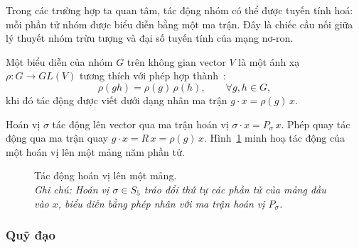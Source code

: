 Trong các trường hợp ta quan tâm, tác động nhóm có thể được tuyến tính hoá: mỗi phần tử nhóm được biểu diễn bằng một ma trận. Đây là chiếc cầu nối giữa lý thuyết nhóm trừu tượng và đại số tuyến tính của mạng nơ-ron.
 
\begin{definition}
\label{def:bieu-dien}
Một biểu diễn của nhóm $G$ trên không gian vector $V$ là một ánh xạ $\rho:G\to GL(V)$ tương thích với phép hợp thành~\cite{bronstein2021geometric}:
\begin{equation}
\label{eq:rep-hom}
\rho(gh) = \rho(g)\,\rho(h), \qquad \forall g,h\in G,
\end{equation}
khi đó tác động được viết dưới dạng nhân ma trận $g\cdot x = \rho(g)\,x$.
\end{definition}
 
\begin{example}
\label{vd:rep}
Hoán vị $\sigma$ tác động lên vector qua ma trận hoán vị $\sigma\cdot x = P_{\sigma}\,x$. Phép quay tác động qua ma trận quay $g\cdot x = R\,x = \rho(g)\,x$. Hình~\ref{fig:permutation} minh hoạ tác động của một hoán vị lên một mảng năm phần tử.
\end{example}
 
\begin{figure}[H]
\centering
{}
\caption[Tác động hoán vị lên một mảng]{Tác động hoán vị lên một mảng.\protect\\[2pt]
\textit{Ghi chú: Hoán vị $\sigma\in S_{5}$ tráo đổi thứ tự các phần tử của mảng đầu vào $x$, biểu diễn bằng phép nhân với ma trận hoán vị $P_{\sigma}$.}}
\label{fig:permutation}
\end{figure}
 
\subsubsection{Quỹ đạo}
\label{ssub:orbit}
 
